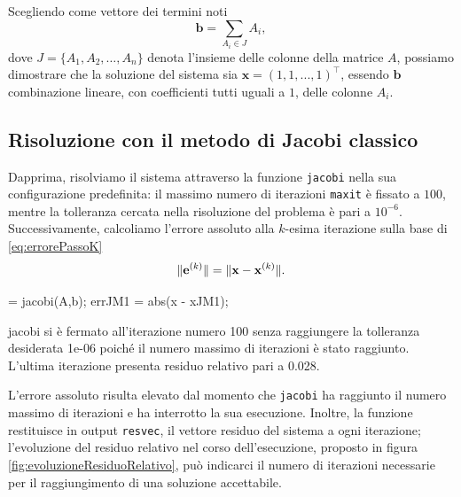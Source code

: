 Scegliendo come vettore dei termini noti
\begin{equation*}
    \mathbf{b} = \sum_ {A_{i} \in J} A_{i},
\end{equation*}
dove $J = \{A_{1}, A_{2},\dots,A_{n}\}$ denota l'insieme delle colonne della matrice $A$, possiamo dimostrare che la soluzione  
del sistema sia $\mathbf{x} = (1, 1, ..., 1)^\top$, essendo $\mathbf{b}$ combinazione lineare, con coefficienti tutti uguali a $\num{1}$, delle colonne $A_{i}$.
\subsection{Risoluzione con il metodo di Jacobi classico}
Dapprima, risolviamo il sistema attraverso la funzione \lstinline{jacobi} nella sua configurazione predefinita:
il massimo numero di iterazioni \lstinline{maxit} \`e fissato a $\num{100}$, mentre la tolleranza cercata nella risoluzione del problema \`e pari a ${10}^{-6}$.\newline
Successivamente, calcoliamo l'errore assoluto alla $k$-esima iterazione sulla base di \eqref{eq:errorePassoK}
\begin{equation*}
\lVert\mathbf{e}^{(k)}\rVert = \lVert\mathbf{x} - \mathbf{x}^{(k)}\rVert.
\end{equation*}
\begin{matlabcode}
     = jacobi(A,b);
    errJM1 = abs(x - xJM1);
\end{matlabcode}
\begin{matlaboutput}
    jacobi si è fermato all'iterazione numero 100 senza
    raggiungere la tolleranza desiderata 1e-06 poiché il
    numero massimo di iterazioni è stato raggiunto.
    L'ultima iterazione presenta residuo relativo 
    pari a 0.028.
\end{matlaboutput}
L'errore assoluto risulta elevato dal momento che \lstinline{jacobi} ha raggiunto il numero massimo di iterazioni e ha interrotto la sua esecuzione.\newline
Inoltre, la funzione restituisce in output \lstinline{resvec}, il vettore residuo del sistema a ogni iterazione; l'evoluzione del
residuo relativo nel corso dell'esecuzione, proposto in figura \ref{fig:evoluzioneResiduoRelativo}, pu\`o indicarci il numero di iterazioni necessarie
per il raggiungimento di una soluzione accettabile.

